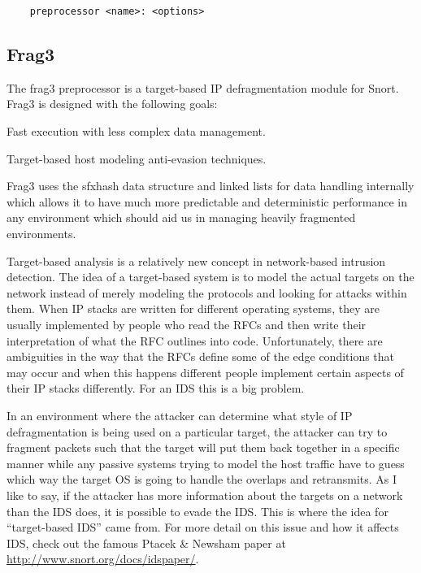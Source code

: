 \documentclass[english]{report}
\newcounter{slistnum}
\newenvironment{slist}
{ \begin{list}{ {\bf \arabic{slistnum}.} }{\usecounter{slistnum} } }
{ \end{list} }
\begin{document}
\begin{verbatim}
    preprocessor <name>: <options>
\end{verbatim}

\subsection{Frag3}
\label{frag3 section}

The frag3 preprocessor is a target-based IP defragmentation module for Snort.
Frag3 is designed with the following goals:

\begin{slist}
\item Fast execution with less complex data management.
\item Target-based host modeling anti-evasion techniques.
\end{slist}

Frag3 uses the sfxhash data structure and linked lists for data handling
internally which allows it to have much more predictable and deterministic
performance in any environment which should aid us in managing heavily
fragmented environments.

Target-based analysis is a relatively new concept in network-based intrusion
detection.  The idea of a target-based system is to model the actual targets on
the network instead of merely modeling the protocols and looking for attacks
within them.  When IP stacks are written for different operating systems, they
are usually implemented by people who read the RFCs and then write their
interpretation of what the RFC outlines into code.  Unfortunately, there are
ambiguities in the way that the RFCs define some of the edge conditions that
may occur and when this happens different people implement certain aspects of
their IP stacks differently.  For an IDS this is a big problem.

In an environment where the attacker can determine what style of IP
defragmentation is being used on a particular target, the attacker can try to
fragment packets such that the target will put them back together in a specific
manner while any passive systems trying to model the host traffic have to guess
which way the target OS is going to handle the overlaps and retransmits.  As I
like to say, if the attacker has more information about the targets on a
network than the IDS does, it is possible to evade the IDS.  This is where the
idea for ``target-based IDS'' came from.  For more detail on this issue and how
it affects IDS, check out the famous Ptacek \& Newsham paper at
\url{http://www.snort.org/docs/idspaper/}.
\end{document}
